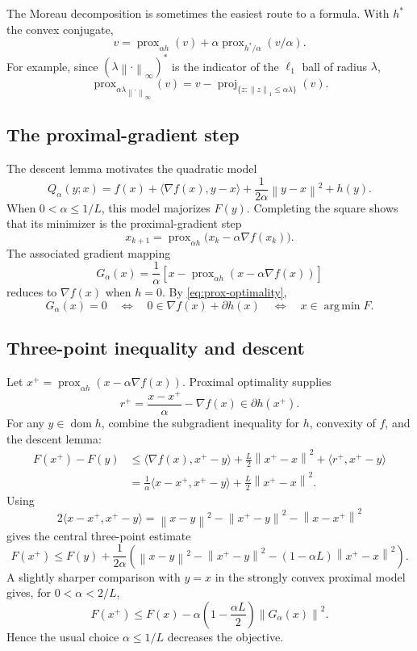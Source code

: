 \documentclass[12pt,oneside]{book}
\numberwithin{equation}{section}
\theoremstyle{definition}
\theoremstyle{plain}
\theoremstyle{remark}
\newcommand{\argmin}{\operatorname*{arg\,min}}
\newcommand{\norm}[1]{\left\lVert #1 \right\rVert}
\newcommand{\grad}{\nabla}
\begin{document}
The Moreau decomposition is sometimes the easiest route to a formula. With
$h^*$ the convex conjugate,
\[
 v=\operatorname{prox}_{\alpha h}(v)
   +\alpha\operatorname{prox}_{h^*/\alpha}(v/\alpha).
\]
For example, since $(\lambda\norm{\cdot}_\infty)^*$ is the indicator of the
$\ell_1$ ball of radius $\lambda$,
\[
 \operatorname{prox}_{\alpha\lambda\norm{\cdot}_\infty}(v)
 =v-\operatorname{proj}_{\{z:\norm z_1\leq\alpha\lambda\}}(v).
\]

\subsection{The proximal-gradient step}

The descent lemma motivates the quadratic model
\[
 Q_\alpha(y;x)=f(x)+\langle\nabla f(x),y-x\rangle
       +\frac{1}{2\alpha}\norm{y-x}^2+h(y).
\]
When $0<\alpha\leq1/L$, this model majorizes $F(y)$. Completing the square
shows that its minimizer is the proximal-gradient step
\begin{equation}
 x_{k+1}=\operatorname{prox}_{\alpha h}
             \bigl(x_k-\alpha\grad f(x_k)\bigr).
 \label{eq:proximal-gradient}
\end{equation}
The associated gradient mapping
\[
 G_\alpha(x)=\frac1\alpha\left[x-
 \operatorname{prox}_{\alpha h}(x-\alpha\nabla f(x))\right]
\]
reduces to $\nabla f(x)$ when $h=0$. By \eqref{eq:prox-optimality},
\[
 G_\alpha(x)=0
 \quad\Longleftrightarrow\quad
 0\in\nabla f(x)+\partial h(x)
 \quad\Longleftrightarrow\quad x\in\argmin F.
\]

\subsection{Three-point inequality and descent}

Let $x^+=\operatorname{prox}_{\alpha h}(x-\alpha\nabla f(x))$. Proximal
optimality supplies
\[
 r^+=\frac{x-x^+}{\alpha}-\nabla f(x)\in\partial h(x^+).
\]
For any $y\in\operatorname{dom}h$, combine the subgradient inequality for
$h$, convexity of $f$, and the descent lemma:
\begin{align*}
 F(x^+)-F(y)
 &\leq\langle\nabla f(x),x^+-y\rangle
       +\frac L2\norm{x^+-x}^2+\langle r^+,x^+-y\rangle\\
 &=\frac1\alpha\langle x-x^+,x^+-y\rangle
       +\frac L2\norm{x^+-x}^2.
\end{align*}
Using
\[
 2\langle x-x^+,x^+-y\rangle
 =\norm{x-y}^2-\norm{x^+-y}^2-\norm{x-x^+}^2
\]
gives the central three-point estimate
\begin{equation}\label{eq:prox-three-point}
 F(x^+)\leq F(y)+\frac1{2\alpha}
 \left(\norm{x-y}^2-\norm{x^+-y}^2
 -(1-\alpha L)\norm{x^+-x}^2\right).
\end{equation}
A slightly sharper comparison with $y=x$ in the strongly convex proximal
model gives, for $0<\alpha<2/L$,
\begin{equation}\label{eq:prox-decrease}
 F(x^+)\leq F(x)-\alpha\left(1-\frac{\alpha L}{2}\right)
 \norm{G_\alpha(x)}^2.
\end{equation}
Hence the usual choice $\alpha\leq1/L$ decreases the objective.
\end{document}
